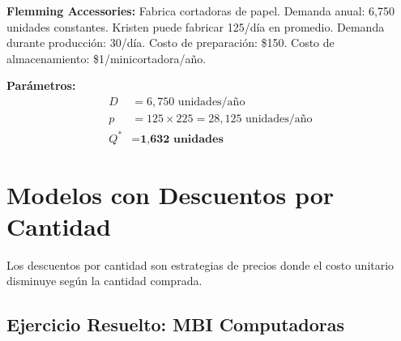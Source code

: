 \documentclass[12pt,a4paper]{book}
\begin{document}
	\begin{tcolorbox}[enhanced,colback=violetaclaro,colframe=moradoacento,boxrule=2pt,arc=8pt,
		drop shadow,title={\bfseries\color{white} \faPuzzlePiece\ PROBLEMA}]
		
		\textbf{Flemming Accessories:} Fabrica cortadoras de papel. Demanda anual: 6,750 unidades constantes. Kristen puede fabricar 125/día en promedio. Demanda durante producción: 30/día. Costo de preparación: \$150. Costo de almacenamiento: \$1/minicortadora/año.
		
	\end{tcolorbox}
	
	\begin{tcolorbox}[enhanced,colback=azulclaro,colframe=azulprincipal,boxrule=2pt,arc=8pt,
		title={\bfseries\color{white} \faCalculator\ SOLUCIÓN}]
		
		\textbf{Parámetros:}
		\begin{align}
			D &= 6,750 \text{ unidades/año}\\
			p &= 125 \times 225 = 28,125 \text{ unidades/año}\\
			Q^* &= \textbf{1,632 unidades}
		\end{align}
		
	\end{tcolorbox}
	
	\section{Modelos con Descuentos por Cantidad}
	
	\begin{tcolorbox}[enhanced,colback=violetaclaro,colframe=moradoacento,boxrule=3pt,arc=12pt,
		drop shadow,title={\Large\bfseries\color{white} \faTag\ FUNDAMENTOS DEL MODELO}]
		
		Los descuentos por cantidad son estrategias de precios donde el costo unitario disminuye según la cantidad comprada.
		
	\end{tcolorbox}
	
	\subsection{Ejercicio Resuelto: MBI Computadoras}
	
\end{document}
